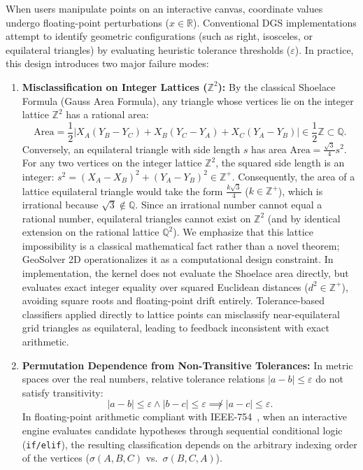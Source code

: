 \documentclass[preprint,12pt]{elsarticle}
\begin{document}
When users manipulate points on an interactive canvas, coordinate values undergo floating-point perturbations ($x \in \mathbb{R}$). Conventional DGS implementations attempt to identify geometric configurations (such as right, isosceles, or equilateral triangles) by evaluating heuristic tolerance thresholds ($\varepsilon$). In practice, this design introduces two major failure modes:

\begin{enumerate}
\item \textbf{Misclassification on Integer Lattices ($\mathbb{Z}^2$):} By the classical Shoelace Formula (Gauss Area Formula), any triangle whose vertices lie on the integer lattice $\mathbb{Z}^2$ has a rational area:
\begin{equation}
\label{eq:shoelace}
\text{Area} = \frac{1}{2} \left| X_A(Y_B - Y_C) + X_B(Y_C - Y_A) + X_C(Y_A - Y_B) \right| \in \frac{1}{2}\mathbb{Z} \subset \mathbb{Q}.
\end{equation}
Conversely, an equilateral triangle with side length $s$ has area $\text{Area} = \frac{\sqrt{3}}{4}s^2$. For any two vertices on the integer lattice $\mathbb{Z}^2$, the squared side length is an integer: $s^2 = (X_A - X_B)^2 + (Y_A - Y_B)^2 \in \mathbb{Z}^+$. Consequently, the area of a lattice equilateral triangle would take the form $\frac{k\sqrt{3}}{4}$ ($k \in \mathbb{Z}^+$), which is irrational because $\sqrt{3} \notin \mathbb{Q}$. Since an irrational number cannot equal a rational number, equilateral triangles cannot exist on $\mathbb{Z}^2$ (and by identical extension on the rational lattice $\mathbb{Q}^2$). We emphasize that this lattice impossibility is a classical mathematical fact rather than a novel theorem; GeoSolver 2D operationalizes it as a computational design constraint. In implementation, the kernel does not evaluate the Shoelace area directly, but evaluates exact integer equality over squared Euclidean distances ($d^2 \in \mathbb{Z}^+$), avoiding square roots and floating-point drift entirely. Tolerance-based classifiers applied directly to lattice points can misclassify near-equilateral grid triangles as equilateral, leading to feedback inconsistent with exact arithmetic.

\item \textbf{Permutation Dependence from Non-Transitive Tolerances:} In metric spaces over the real numbers, relative tolerance relations $|a - b| \le \varepsilon$ do not satisfy transitivity:
\begin{equation}
\label{eq:nontransitive}
|a - b| \le \varepsilon \land |b - c| \le \varepsilon \not\implies |a - c| \le \varepsilon.
\end{equation}
In floating-point arithmetic compliant with IEEE-754~\cite{ieee754}, when an interactive engine evaluates candidate hypotheses through sequential conditional logic (\texttt{if/elif}), the resulting classification depends on the arbitrary indexing order of the vertices ($\sigma(A, B, C)$ vs.\ $\sigma(B, C, A)$).
\end{enumerate}
\end{document}
